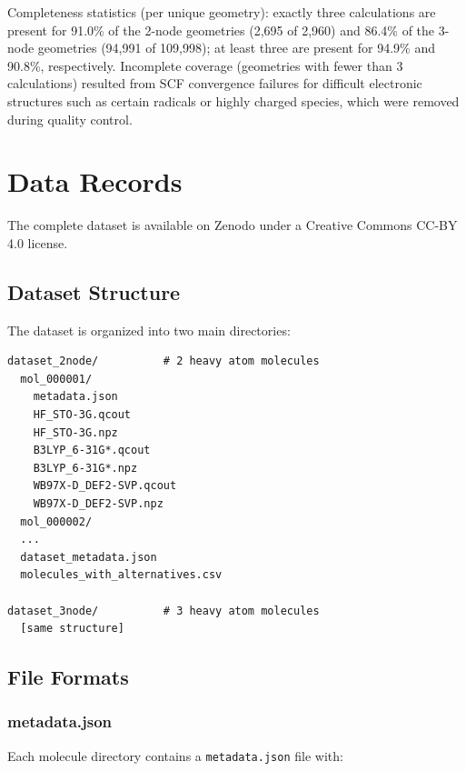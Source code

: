 \documentclass[fleqn,10pt]{article}
\begin{document}
Completeness statistics (per unique geometry): exactly three calculations are present for 91.0\% of the 2-node geometries (2,695 of 2,960) and 86.4\% of the 3-node geometries (94,991 of 109,998); at least three are present for 94.9\% and 90.8\%, respectively. Incomplete coverage (geometries with fewer than 3 calculations) resulted from SCF convergence failures for difficult electronic structures such as certain radicals or highly charged species, which were removed during quality control.


\section*{Data Records}

The complete dataset is available on Zenodo\cite{zenodo_doi} under a Creative Commons CC-BY 4.0 license.

\subsection*{Dataset Structure}

The dataset is organized into two main directories:

\begin{verbatim}
dataset_2node/          # 2 heavy atom molecules
  mol_000001/
    metadata.json
    HF_STO-3G.qcout
    HF_STO-3G.npz
    B3LYP_6-31G*.qcout
    B3LYP_6-31G*.npz
    WB97X-D_DEF2-SVP.qcout
    WB97X-D_DEF2-SVP.npz
  mol_000002/
  ...
  dataset_metadata.json
  molecules_with_alternatives.csv

dataset_3node/          # 3 heavy atom molecules
  [same structure]
\end{verbatim}

\subsection*{File Formats}

\subsubsection*{metadata.json}

Each molecule directory contains a \texttt{metadata.json} file with:
\end{document}
